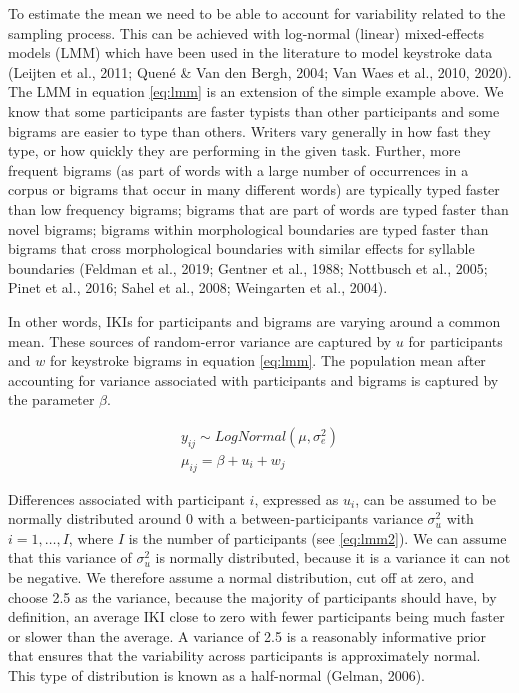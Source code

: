 \documentclass[
  english,
  man,mask,floatsintext]{apa7}
\begin{document}
To estimate the mean we need to be able to account for variability related to the sampling process. This can be achieved with log-normal (linear) mixed-effects models (LMM) which have been used in the literature to model keystroke data (Leijten et al., 2011; Quené \& Van den Bergh, 2004; Van Waes et al., 2010, 2020). The LMM in equation \ref{eq:lmm} is an extension of the simple example above. We know that some participants are faster typists than other participants and some bigrams are easier to type than others. Writers vary generally in how fast they type, or how quickly they are performing in the given task. Further, more frequent bigrams (as part of words with a large number of occurrences in a corpus or bigrams that occur in many different words) are typically typed faster than low frequency bigrams; bigrams that are part of words are typed faster than novel bigrams; bigrams within morphological boundaries are typed faster than bigrams that cross morphological boundaries with similar effects for syllable boundaries (Feldman et al., 2019; Gentner et al., 1988; Nottbusch et al., 2005; Pinet et al., 2016; Sahel et al., 2008; Weingarten et al., 2004).

In other words, IKIs for participants and bigrams are varying around a common mean. These sources of random-error variance are captured by \(u\) for participants and \(w\) for keystroke bigrams in equation \ref{eq:lmm}. The population mean after accounting for variance associated with participants and bigrams is captured by the parameter \(\beta\).

\begin{equation}
\begin{aligned}
\label{eq:lmm}
y_{ij} \sim LogNormal(\mu, \sigma_e^2)\\
\mu_{ij} = \beta + u_i + w_j
\end{aligned}
\end{equation}

Differences associated with participant \(i\), expressed as \(u_i\), can be assumed to be normally distributed around 0 with a between-participants variance \(\sigma_u^2\) with \(i = 1, \dots, I\), where \(I\) is the number of participants (see \ref{eq:lmm2}). We can assume that this variance of \(\sigma_u^2\) is normally distributed, because it is a variance it can not be negative. We therefore assume a normal distribution, cut off at zero, and choose 2.5 as the variance, because the majority of participants should have, by definition, an average IKI close to zero with fewer participants being much faster or slower than the average. A variance of 2.5 is a reasonably informative prior that ensures that the variability across participants is approximately normal. This type of distribution is known as a half-normal (Gelman, 2006).
\end{document}
